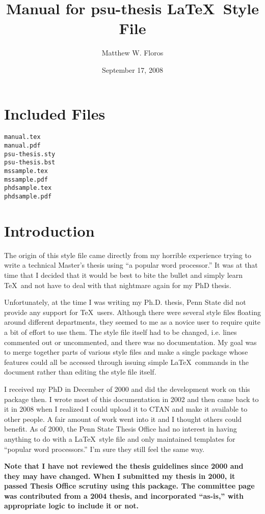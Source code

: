 \documentclass[11pt]{article}
\begin{document}
\begin{singlespace}
\title{Manual for psu-thesis \LaTeX\ Style File}
\author{Matthew W. Floros}
\date{September 17, 2008}
\maketitle
\section*{Included Files}
\begin{verbatim}
manual.tex
manual.pdf
psu-thesis.sty
psu-thesis.bst
mssample.tex
mssample.pdf
phdsample.tex
phdsample.pdf
\end{verbatim}

\section*{Introduction}

The origin of this style file came directly from my horrible experience trying
to write a technical Master's thesis using ``a popular word processor.''  It
was at that time that I decided that it would be best to bite the bullet
and simply learn \TeX\ and not have to deal with that nightmare again for my
PhD thesis. 

Unfortunately, at the time I was writing my Ph.D. thesis, Penn State did not
provide any support for \TeX\ users. Although there were several style files
floating around different departments, they seemed to me as a novice user to
require quite a bit of effort to use them.  The style file itself had to be
changed, i.e. lines commented out or uncommented, and there was no
documentation.  My goal was to merge together parts of various style files and
make a single package whose features could all be accessed through issuing
simple \LaTeX\ commands in the document rather than editing the style file
itself.

I received my PhD in December of 2000 and did the development work on this
package then.  I wrote most of this documentation in 2002 and then came back to
it in 2008 when I realized I could upload it to CTAN and make it available to
other people.  A fair amount of work went into it and I thought others could
benefit.  As of 2000, the Penn State Thesis Office had no interest in
having anything to do with a \LaTeX\ style file and only maintained templates
for ``popular word processors.''  I'm sure they still feel the same way.

{\bfseries Note that I have not reviewed the thesis guidelines since 2000 and
they may have changed.  When I submitted my thesis in 2000, it passed Thesis
Office scrutiny using this package.  The committee page was contributed from a
2004 thesis, and incorporated ``as-is,'' with appropriate logic to include it or
not.}


\end{singlespace}
\end{document}
